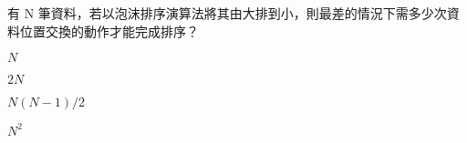 \ifx\ntpcNinetyTwo\undefined[92學年基北區] \fi
有 N 筆資料，若以泡沫排序演算法將其由大排到小，則最差的情況下需多少次資料位置交換的動作才能完成排序？
  \begin{optionlist}
  \item $N$
  \item $2N$
  \item $N(N-1)/2$\label{ntpc-92-a39}
  \item $N^2$
  \end{optionlist}